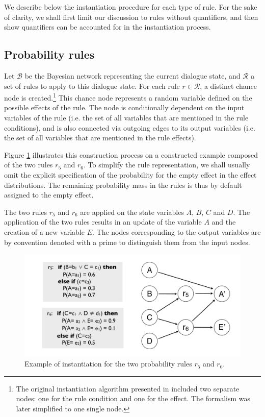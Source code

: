 We describe below the instantiation procedure for each type of rule. For the sake of clarity, we shall first limit our discussion to rules without quantifiers, and then show quantifiers can be accounted for in the instantiation process. 

\subsection{Probability rules}
\label{sec:probruleinstantiation}

Let $\mathcal{B}$ be the Bayesian network representing the current dialogue state, and $\mathcal{R}$ a set of rules to apply to this dialogue state.  For each rule $r \in \mathcal{R}$, a distinct chance node is created.\footnote{The original instantiation algorithm presented in \citep{rulebasedmodels-sigdial2012} included two separate nodes: one for the rule condition and one for the effect.  The formalism was later simplified to one single node.} This chance node represents a random variable defined on the possible effects of the rule.  The node is conditionally dependent on the input variables of the rule (i.e. the set of all variables that are mentioned in the rule conditions), and is also connected via outgoing edges to its output variables (i.e. the set of all variables that are mentioned in the rule effects). 

Figure \ref{fig:instantiationprob} illustrates this construction process on a constructed example composed of the two rules $r_5$ and $r_6$.  To simplify the rule representation, we shall usually omit the explicit specification of the probability for the empty effect in the effect distributions.  The remaining probability mass in the rules is thus by default assigned to the empty effect.

The two rules $r_5$ and $r_6$ are applied on the state variables $A$, $B$, $C$ and $D$.  The application of the two rules results in an update of the variable $A$ and the creation of a new variable $E$. The nodes corresponding to the output variables are by convention denoted with a prime to distinguish them from the input nodes.  

\begin{figure}[h]
\centering
\includegraphics[scale=0.25]{imgs/ruleinstantiation.pdf}
\caption{Example of instantiation for the two probability rules $r_5$ and $r_6$. }
\label{fig:instantiationprob}
\end{figure}

